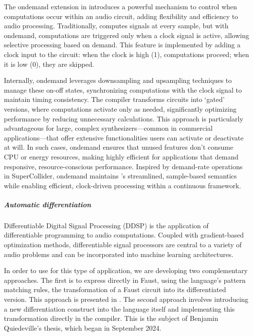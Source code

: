 The ondemand extension in \F{} introduces a powerful mechanism to
control when computations occur within an audio circuit, adding
flexibility and efficiency to audio processing. Traditionally, \F{}
computes signals at every sample, but with ondemand, computations are
triggered only when a clock signal is active, allowing selective
processing based on demand. This feature is implemented by adding a
clock input to the circuit: when the clock is high (1), computations
proceed; when it is low (0), they are skipped.

Internally, ondemand leverages downsampling and upsampling techniques to
manage these on-off states, synchronizing computations with the clock
signal to maintain timing consistency. The \F{} compiler transforms
circuits into `gated' versions, where computations activate only as
needed, significantly optimizing performance by reducing unnecessary
calculations. This approach is particularly advantageous for large,
complex synthesizers---common in commercial applications---that offer
extensive functionalities users can activate or deactivate at will. In
such cases, ondemand ensures that unused features don't consume CPU or
energy resources, making \F{} highly efficient for applications that
demand responsive, resource-conscious performance. Inspired by
demand-rate operations in SuperCollider, ondemand maintains \F{}'s
streamlined, sample-based semantics while enabling efficient,
clock-driven processing within a continuous framework.

\subparagraph{Automatic differentiation}

Differentiable Digital Signal Processing (DDSP) \cite{engel2020ddsp} is the application of differentiable programming to audio computations. Coupled with gradient-based optimization methods, differentiable signal processors are central to a variety of audio problems and can be incorporated into machine learning architectures.

In order to use \F{} for this type of application, we are developing two complementary approaches. The first is to express directly in Faust, using the language's pattern matching rules, the transformation of a Faust circuit into its differentiated version. This approach is presented in \cite{rushton:hal-04849619}. The second approach involves introducing a new differentiation construct into the language itself and implementing this transformation directly in the \F{} compiler. This is the subject of Benjamin Quiedeville's thesis, which began in September 2024.


